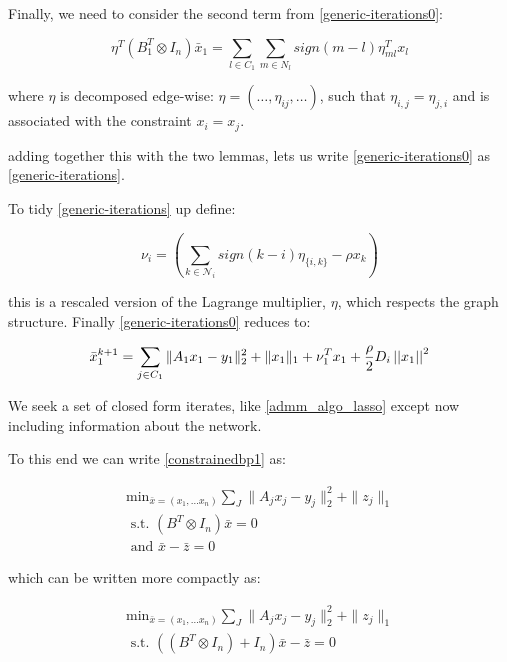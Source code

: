 \documentclass{article}
\begin{document}
Finally, we need to consider the second term from \eqref{generic-iterations0}:

\begin{equation}
\eta^T\left(B_1^T \otimes I_n\right)\bar{x}_1 = \sum_{l\in C_1} \sum_{m\in N_l}sign\left(m-l\right)\eta_{ml}^T x_l
\label{eq:graph-multiplier}
\end{equation}

where \(\eta\) is decomposed edge-wise: \(\eta = \left(\ldots, \eta_{ij},\ldots\right)\), such that \(\eta_{i,j} = \eta_{j,i}\) and is associated with the constraint \(x_i = x_j\).

adding together this with the two lemmas, lets us write \eqref{generic-iterations0} as \eqref{generic-iterations}.

To tidy \eqref{generic-iterations} up define:

\begin{equation}
\nu_i = \left(\sum_{k \in \mathcal{N}_i} sign\left(k-i\right)\eta_{\{i,k\}} - \rho x_k \right)
\end{equation}

this is a rescaled version of the Lagrange multiplier, \(\eta\), which respects the graph structure. Finally \eqref{generic-iterations0} reduces to:

\begin{align}
\bar{x}_1^{k+1} = \sum_{j \in C_1} \|A_1x_1 - y_1\|_2^2 + \|x_1\|_1 + \nu_1^T x_1 + \frac{\rho}{2}D_i\left|\left|x_1\right|\right|^2
\label{generic-iterations-nice}
\end{align}

We seek a set of closed form iterates, like \eqref{admm_algo_lasso} except now including information about the network.

To this end we can write \eqref{constrainedbp1} as:

\begin{align}
\text{min}_{\bar{x} = \left(x_1, \ldots x_n\right)} \sum_J \|A_jx_j - y_j\|_2^2 + \|z_j\|_1
\\
\text{ s.t. } \left(B^T \otimes I_n\right)\bar{x} = 0
\\
\text{ and } \bar{x} - \bar{z} = 0
\label{constrainedbp2:switching trick}
\end{align}

which can be written more compactly as:

\begin{align}
\text{min}_{\bar{x} = \left(x_1, \ldots x_n\right)} \sum_J \|A_jx_j - y_j\|_2^2 + \|z_j\|_1
\\
\text{ s.t. } \left(\left(B^T \otimes I_n\right) + I_n \right)\bar{x} - \bar{z} = 0
\label{constrainedbp2:switching trick}
\end{align}
\end{document}
